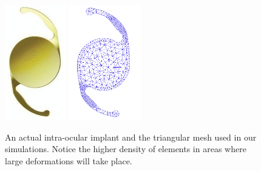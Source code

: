 \documentclass{llncs}
\begin{document}
\begin{figure}[!h]
\centering
\includegraphics[height=5cm]{images/IOL}
\includegraphics[height=5cm]{images/mesh_implant}
\caption [Lens implant and its mesh] {An actual intra-ocular implant and the triangular mesh used in our simulations. Notice the higher density of elements in areas where large deformations will take place.}
\label{fig-mesh}
\end{figure}
\end{document}

